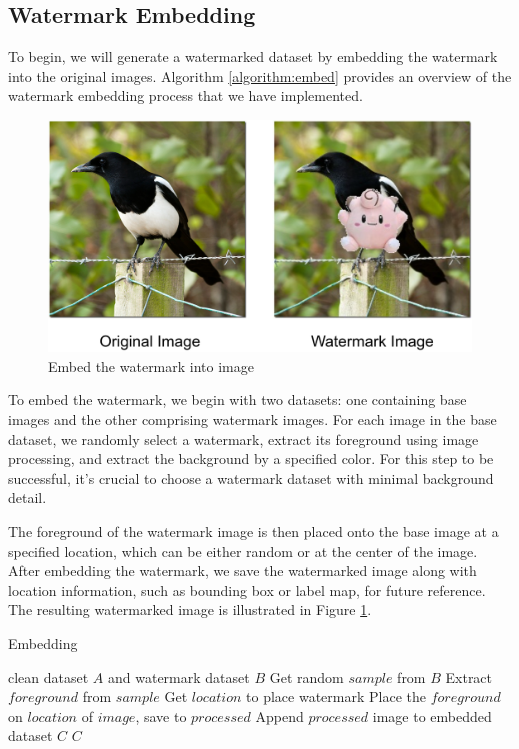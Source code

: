\subsection{Watermark Embedding}
\label{chapter:d:section:emb}
To begin, we will generate a watermarked dataset by embedding the watermark into the original images. Algorithm \ref{algorithm:embed} provides an overview of the watermark embedding process that we have implemented.
\begin{figure}[H]
 \centering
 \includegraphics[width=0.75\linewidth]{img/embedded.png}

 \caption{Embed the watermark into image}
 \label{figure:embed_img}
\end{figure}
To embed the watermark, we begin with two datasets: one containing base images and the other comprising watermark images. For each image in the base dataset, we randomly select a watermark, extract its foreground using image processing, and extract the background by a specified color. For this step to be successful, it's crucial to choose a watermark dataset with minimal background detail.

The foreground of the watermark image is then placed onto the base image at a specified location, which can be either random or at the center of the image. After embedding the watermark, we save the watermarked image along with location information, such as bounding box or label map, for future reference. The resulting watermarked image is illustrated in Figure \ref{figure:embed_img}.
\begin{algorithm}[H]
 \caption{Embedding}
 \label{algorithm:embed}
 \begin{algorithmic}[1]
   clean dataset $A$ and watermark dataset $B$
  \STATE Get random $sample$ from $B$
  \STATE Extract $foreground$ from $sample$
  \STATE Get $location$ to place watermark
  \STATE Place the $foreground$ on $location$ of $image$, save to $processed$
  \STATE Append $processed$ image to embedded dataset $C$
  \ENDFOR
   $C$
 \end{algorithmic}
\end{algorithm}
